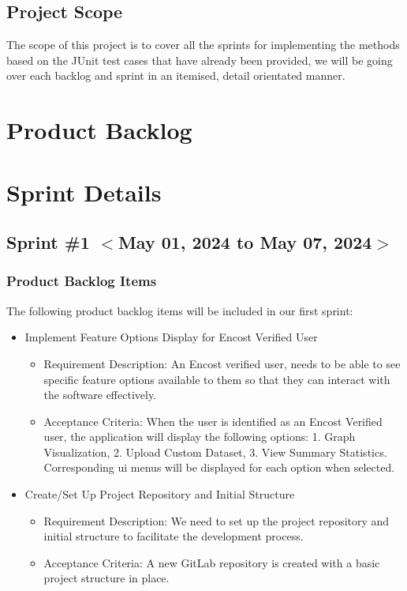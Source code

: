 \documentclass{scrreprt}
\begin{document}
% 
% 
\section{Project Scope}

The scope of this project is to cover all the sprints for implementing the methods based on the JUnit test cases that have already been provided, we will be going over each backlog and sprint in an itemised, detail orientated manner.

% 
% 
% 


% 
% 
% 
\chapter{Product Backlog}

% 
% 
% 
\chapter{Sprint Details}


% 
% 
\section{Sprint \#1 $<$May 01, 2024 to May 07, 2024$>$}

% 
\subsection{Product Backlog Items}
The following product backlog items will be included in our first sprint:

\begin{itemize}
    \item Implement Feature Options Display for Encost Verified User
    \begin{itemize}
        \item Requirement Description: An Encost verified user, needs to be able to see specific feature options available to them so that they can interact with the software effectively.
        \item Acceptance Criteria: When the user is identified as an Encost Verified user, the application will display the following options: 1. Graph Visualization, 2. Upload Custom Dataset, 3. View Summary Statistics. Corresponding ui menus will be displayed for each option when selected.
    \end{itemize}
    \item Create/Set Up Project Repository and Initial Structure
    \begin{itemize}
        \item Requirement Description: We need to set up the project repository and initial structure to facilitate the development process.
        \item Acceptance Criteria: A new GitLab repository is created with a basic project structure in place.
    \end{itemize}
\end{itemize}
% 
\end{document}
